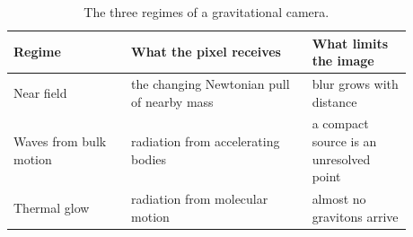 \begin{table}
\centering
\begin{tabular}{p{0.26\linewidth}p{0.4\linewidth}p{0.22\linewidth}}
Regime & What the pixel receives & What limits the image \\ \hline
Near field & the changing Newtonian pull of nearby mass & blur grows with distance \\
Waves from bulk motion & radiation from accelerating bodies & a compact source is an unresolved point \\
Thermal glow & radiation from molecular motion & almost no gravitons arrive \\
\end{tabular}
\caption{The three regimes of a gravitational camera.}\label{tab:regimes}
\end{table}

